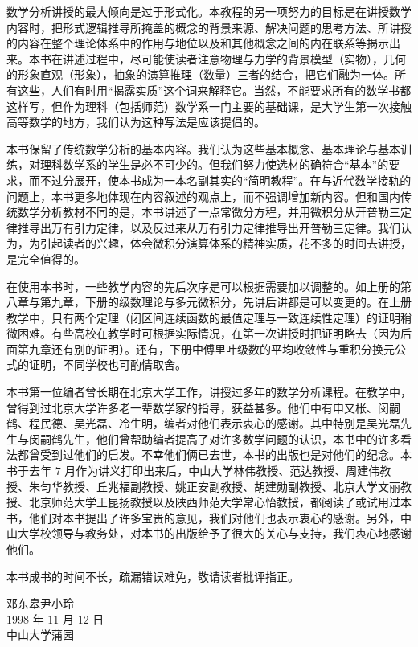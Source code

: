 数学分析讲授的最大倾向是过于形式化。本教程的另一项努力的目标是在讲授数学内容时，把形式逻辑推导所掩盖的概念的背景来源、解决问题的思考方法、所讲授的内容在整个理论体系中的作用与地位以及和其他概念之间的内在联系等揭示出来。本书在讲述过程中，尽可能使读者注意物理与力学的背景模型（实物），几何的形象直观（形象），抽象的演算推理（数量）三者的结合，把它们融为一体。所有这些，人们有时用``揭露实质''这个词来解释它。当然，不能要求所有的数学书都这样写，但作为理科（包括师范）数学系一门主要的基础课，是大学生第一次接触高等数学的地方，我们认为这种写法是应该提倡的。

本书保留了传统数学分析的基本内容。我们认为这些基本概念、基本理论与基本训练，对理科数学系的学生是必不可少的。但我们努力使选材的确符合``基本''的要求，而不过分展开，使本书成为一本名副其实的``简明教程''。在与近代数学接轨的问题上，本书更多地体现在内容叙述的观点上，而不强调增加新内容。但和国内传统数学分析教材不同的是，本书讲述了一点常微分方程，并用微积分从开普勒三定律推导出万有引力定律，以及反过来从万有引力定律推导出开普勒三定律。我们认为，为引起读者的兴趣，体会微积分演算体系的精神实质，花不多的时间去讲授，是完全值得的。

在使用本书时，一些教学内容的先后次序是可以根据需要加以调整的。如上册的第八章与第九章，下册的级数理论与多元微积分，先讲后讲都是可以变更的。在上册教学中，只有两个定理（闭区间连续函数的最值定理与一致连续性定理）的证明稍微困难。有些高校在教学时可根据实际情况，在第一次讲授时把证明略去（因为后面第九章还有别的证明）。还有，下册中傅里叶级数的平均收敛性与重积分换元公式的证明，不同学校也可酌情取舍。

本书第一位编者曾长期在北京大学工作，讲授过多年的数学分析课程。在教学中，曾得到过北京大学许多老一辈数学家的指导，获益甚多。他们中有申又枨、闵嗣鹤、程民德、吴光磊、冷生明，编者对他们表示衷心的感谢。其中特别是吴光磊先生与闵嗣鹤先生，他们曾帮助编者提高了对许多数学问题的认识，本书中的许多看法都曾受到过他们的启发。不幸他们俩已去世，本书的出版也是对他们的纪念。本书于去年 $7$ 月作为讲义打印出来后，中山大学林伟教授、范达教授、周建伟教授、朱匀华教授、丘兆福副教授、姚正安副教授、胡建勋副教授、北京大学文丽教授、北京师范大学王昆扬教授以及陕西师范大学常心怡教授，都阅读了或试用过本书，他们对本书提出了许多宝贵的意见，我们对他们也表示衷心的感谢。另外，中山大学校领导与教务处，对本书的出版给予了很大的关心与支持，我们衷心地感谢他们。

本书成书的时间不长，疏漏错误难免，敬请读者批评指正。

\vspace{2em}
\begin{flushright}
邓东皋\quad 尹小玲\\[0.5em]
$1998$ 年 $11$ 月 $12$ 日\\[0.5em]
中山大学蒲园
\end{flushright}
\clearpage
